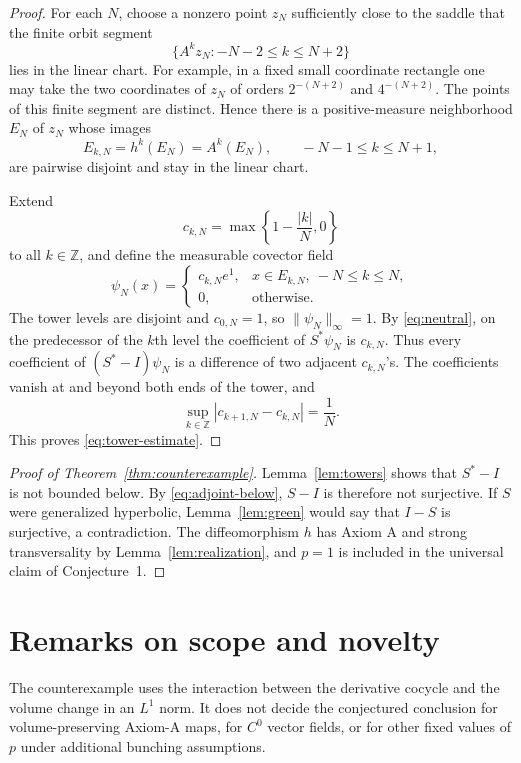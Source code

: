 \documentclass[11pt]{article}
\begin{document}
\begin{proof}
For each $N$, choose a nonzero point $z_N$ sufficiently close to the saddle
that the finite orbit segment
\[
 \{A^kz_N:-N-2\leq k\leq N+2\}
\]
lies in the linear chart.  For example, in a fixed small coordinate rectangle
one may take the two coordinates of $z_N$ of orders $2^{-(N+2)}$ and
$4^{-(N+2)}$.  The points of this finite segment are distinct.  Hence there
is a positive-measure neighborhood $E_N$ of $z_N$ whose images
\[
 E_{k,N}=h^k(E_N)=A^k(E_N),\qquad -N-1\leq k\leq N+1,
\]
are pairwise disjoint and stay in the linear chart.

Extend
\[
 c_{k,N}=\max\left\{1-\frac{|k|}{N},0\right\}
\]
to all $k\in\mathbb Z$, and define the measurable covector field
\[
 \psi_N(x)=
 \begin{cases}
   c_{k,N}e^1,&x\in E_{k,N},\ -N\leq k\leq N,\\
   0,&\text{otherwise}.
 \end{cases}
\]
The tower levels are disjoint and $c_{0,N}=1$, so
$\|\psi_N\|_\infty=1$.  By \eqref{eq:neutral}, on the predecessor of the
$k$th level the coefficient of $S^*\psi_N$ is $c_{k,N}$.  Thus every
coefficient of $(S^*-I)\psi_N$ is a difference of two adjacent $c_{k,N}$'s.
The coefficients vanish at and beyond both ends of the tower, and
\[
 \sup_{k\in\mathbb Z}|c_{k+1,N}-c_{k,N}|=\frac1N.
\]
This proves \eqref{eq:tower-estimate}.
\end{proof}

\begin{proof}[Proof of Theorem~\ref{thm:counterexample}]
Lemma~\ref{lem:towers} shows that $S^*-I$ is not bounded below.  By
\eqref{eq:adjoint-below}, $S-I$ is therefore not surjective.  If $S$ were
generalized hyperbolic, Lemma~\ref{lem:green} would say that $I-S$ is
surjective, a contradiction.  The diffeomorphism $h$ has Axiom A and strong
transversality by Lemma~\ref{lem:realization}, and $p=1$ is included in the
universal claim of Conjecture~1.
\end{proof}

\section{Remarks on scope and novelty}

The counterexample uses the interaction between the derivative cocycle and
the volume change in an $L^1$ norm.  It does not decide the conjectured
conclusion for volume-preserving Axiom-A maps, for $C^0$ vector fields, or for
other fixed values of $p$ under additional bunching assumptions.
\end{document}
